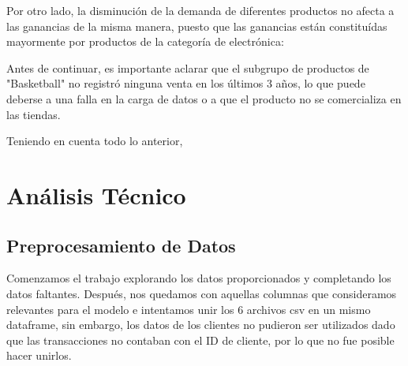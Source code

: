 \documentclass[12pt,a4paper]{article}
\begin{document}
Por otro lado, la disminución de la demanda de diferentes productos no afecta a las ganancias de la misma 
manera, puesto que las ganancias están constituídas mayormente por productos de la categoría de electrónica:

\begin{center}
\end{center}

Antes de continuar, es importante aclarar que el subgrupo de productos de "Basketball" no registró ninguna venta en los últimos 3 años, lo que puede deberse 
a una falla en la carga de datos o a que el producto no se comercializa en las tiendas.

\vspace{0.2cm}

Teniendo en cuenta todo lo anterior, 










\newpage

\section{Análisis Técnico}

\subsection{Preprocesamiento de Datos}

Comenzamos el trabajo explorando los datos proporcionados y completando los datos faltantes. Después, nos quedamos con aquellas 
columnas que consideramos relevantes para el modelo e intentamos unir los 6 archivos csv en un mismo dataframe, sin embargo, 
los datos de los clientes no pudieron ser utilizados dado que las transacciones no contaban con el ID de cliente, por lo que no 
fue posible hacer unirlos. 
\end{document}
